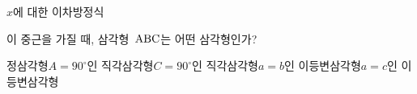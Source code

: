 $x$에 대한 이차방정식 \par\smallskip{}\par\smallskip\noindent 이 중근을 가질 때, 삼각형~$\mathrm{ABC}$는 어떤 삼각형인가?
\begin{choicesii}{정삼각형}{$A=90^\circ$인 직각삼각형}{$C=90^\circ$인 직각삼각형}{$a=b$인 이등변삼각형}{$a=c$인 이등변삼각형}\end{choicesii}
